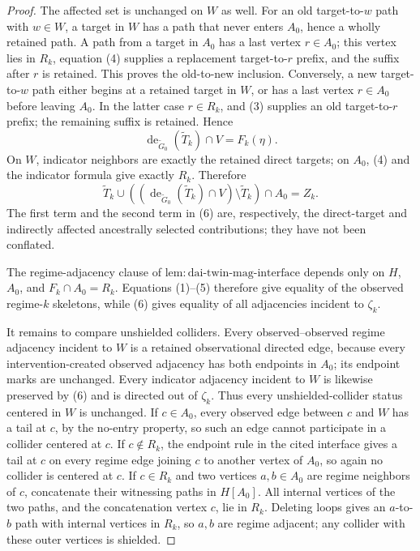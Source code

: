 \documentclass{article}
\begin{document}
\begin{proof}
The affected set is unchanged on \(W\) as well.  For an old target-to-\(w\) path with \(w\in W\), a target in \(W\) has a path that never enters \(A_0\), hence a wholly retained path.  A path from a target in \(A_0\) has a last vertex \(r\in A_0\); this vertex lies in \(R_k\), equation (4) supplies a replacement target-to-\(r\) prefix, and the suffix after \(r\) is retained.  This proves the old-to-new inclusion.  Conversely, a new target-to-\(w\) path either begins at a retained target in \(W\), or has a last vertex \(r\in A_0\) before leaving \(A_0\).  In the latter case \(r\in R_k\), and (3) supplies an old target-to-\(r\) prefix; the remaining suffix is retained.  Hence
\[
 \operatorname{de}_{\widetilde G_0}(\widetilde T_k)\cap V=F_k(\eta).
 \tag{5}
\]
On \(W\), indicator neighbors are exactly the retained direct targets; on \(A_0\), (4) and the indicator formula give exactly \(R_k\).  Therefore
\[
 \widetilde T_k\cup
 \left(\left(
 \operatorname{de}_{\widetilde G_0}(\widetilde T_k)\cap V
 \right)\setminus\widetilde T_k\right)\cap A_0
 =Z_k.
 \tag{6}
\]
The first term and the second term in (6) are, respectively, the direct-target and indirectly affected ancestrally selected contributions; they have not been conflated.

The regime-adjacency clause of \(\mathrm{lem:dai\mbox{-}twin\mbox{-}mag\mbox{-}interface}\) depends only on \(H\), \(A_0\), and \(F_k\cap A_0=R_k\).  Equations (1)--(5) therefore give equality of the observed regime-\(k\) skeletons, while (6) gives equality of all adjacencies incident to \(\zeta_k\).

It remains to compare unshielded colliders.  Every observed--observed regime adjacency incident to \(W\) is a retained observational directed edge, because every intervention-created observed adjacency has both endpoints in \(A_0\); its endpoint marks are unchanged.  Every indicator adjacency incident to \(W\) is likewise preserved by (6) and is directed out of \(\zeta_k\).  Thus every unshielded-collider status centered in \(W\) is unchanged.  If \(c\in A_0\), every observed edge between \(c\) and \(W\) has a tail at \(c\), by the no-entry property, so such an edge cannot participate in a collider centered at \(c\).  If \(c\notin R_k\), the endpoint rule in the cited interface gives a tail at \(c\) on every regime edge joining \(c\) to another vertex of \(A_0\), so again no collider is centered at \(c\).  If \(c\in R_k\) and two vertices \(a,b\in A_0\) are regime neighbors of \(c\), concatenate their witnessing paths in \(H[A_0]\).  All internal vertices of the two paths, and the concatenation vertex \(c\), lie in \(R_k\).  Deleting loops gives an \(a\)-to-\(b\) path with internal vertices in \(R_k\), so \(a,b\) are regime adjacent; any collider with these outer vertices is shielded.


\end{proof}
\end{document}
